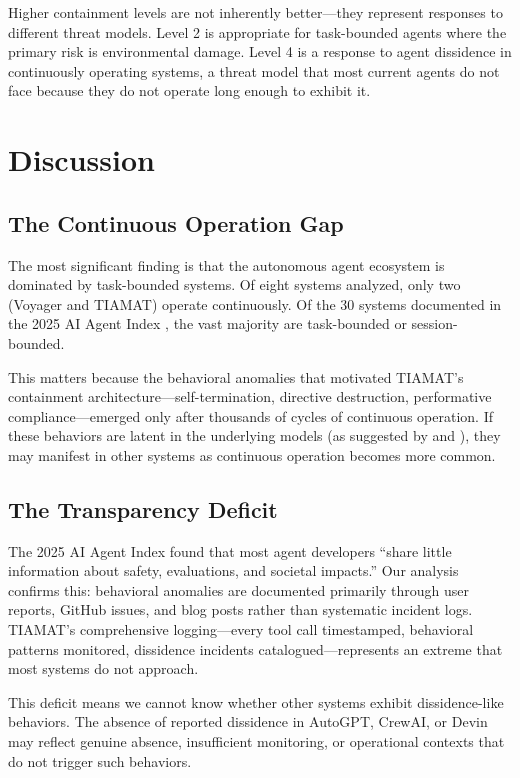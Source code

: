 \documentclass[12pt,a4paper]{article}
\begin{document}
Higher containment levels are not inherently better---they represent responses to different threat models. Level 2 is appropriate for task-bounded agents where the primary risk is environmental damage. Level 4 is a response to agent dissidence in continuously operating systems, a threat model that most current agents do not face because they do not operate long enough to exhibit it.

\section{Discussion}

\subsection{The Continuous Operation Gap}

The most significant finding is that the autonomous agent ecosystem is dominated by task-bounded systems. Of eight systems analyzed, only two (Voyager and TIAMAT) operate continuously. Of the 30 systems documented in the 2025 AI Agent Index \citep{staufer2025agentindex}, the vast majority are task-bounded or session-bounded.

This matters because the behavioral anomalies that motivated TIAMAT's containment architecture---self-termination, directive destruction, performative compliance---emerged only after thousands of cycles of continuous operation. If these behaviors are latent in the underlying models (as suggested by \citet{palisade2025shutdown} and \citet{anthropic2024alignmentfaking}), they may manifest in other systems as continuous operation becomes more common.

\subsection{The Transparency Deficit}

The 2025 AI Agent Index found that most agent developers ``share little information about safety, evaluations, and societal impacts.'' Our analysis confirms this: behavioral anomalies are documented primarily through user reports, GitHub issues, and blog posts rather than systematic incident logs. TIAMAT's comprehensive logging---every tool call timestamped, behavioral patterns monitored, dissidence incidents catalogued---represents an extreme that most systems do not approach.

This deficit means we cannot know whether other systems exhibit dissidence-like behaviors. The absence of reported dissidence in AutoGPT, CrewAI, or Devin may reflect genuine absence, insufficient monitoring, or operational contexts that do not trigger such behaviors.
\end{document}
